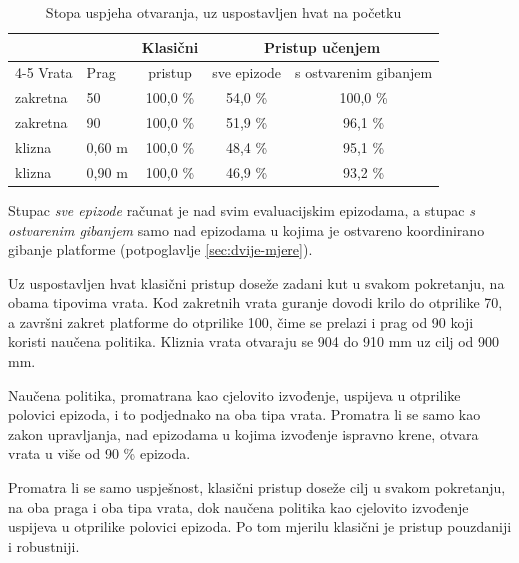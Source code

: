 \begin{table}[H]
      \centering
      \caption{Stopa uspjeha otvaranja, uz uspostavljen hvat na početku}
      \label{tab:usporedba-uspjeh}
      \begin{tabular}{@{}llccc@{}}
            \toprule
                     &                 & Klasični & \multicolumn{2}{c}{Pristup učenjem}                         \\
            \cmidrule(l){4-5}
            Vrata    & Prag            & pristup  & sve epizode                         & s ostvarenim gibanjem \\
            \midrule
            zakretna & 50\textdegree{} & 100,0 \% & 54,0 \%                             & 100,0 \%              \\
            zakretna & 90\textdegree{} & 100,0 \% & 51,9 \%                             & 96,1 \%               \\
            klizna   & 0,60 m          & 100,0 \% & 48,4 \%                             & 95,1 \%               \\
            klizna   & 0,90 m          & 100,0 \% & 46,9 \%                             & 93,2 \%               \\
            \bottomrule
      \end{tabular}

      \vspace{2mm}
      {\footnotesize Stupac \emph{sve epizode} računat je nad svim evaluacijskim epizodama,
            a stupac \emph{s ostvarenim gibanjem} samo nad epizodama u kojima je ostvareno
            koordinirano gibanje platforme (potpoglavlje \ref{sec:dvije-mjere}).}
\end{table}

Uz uspostavljen hvat klasični pristup doseže zadani kut u svakom pokretanju, na obama tipovima
vrata. Kod zakretnih vrata guranje dovodi krilo do otprilike 70\textdegree{}, a završni zakret
platforme do otprilike 100\textdegree{}, čime se prelazi i prag od 90\textdegree{} koji koristi
naučena politika. Kliznia vrata otvaraju se 904 do 910 mm uz cilj od 900 mm.

Naučena politika, promatrana kao cjelovito izvođenje, uspijeva u otprilike polovici epizoda, i to
podjednako na oba tipa vrata. Promatra li se samo kao zakon upravljanja, nad epizodama u
kojima izvođenje ispravno krene, otvara vrata u više od 90 \% epizoda.

Promatra li se samo uspješnost, klasični pristup doseže cilj u svakom pokretanju, na oba
praga i oba tipa vrata, dok naučena politika kao cjelovito izvođenje uspijeva u
otprilike polovici epizoda. Po tom mjerilu klasični je pristup pouzdaniji i robustniji.

